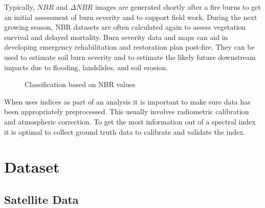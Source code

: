 \documentclass[12pt]{svproc}
\begin{document}
Typically, $NBR$ and $\Delta NBR$ images are generated shortly after a fire burns to get an initial assessment of burn severity and to support field work. During the next growing season, NBR datasets are often calculated again to assess vegetation survival and delayed mortality. Burn severity data and maps can aid in developing emergency rehabilitation and restoration plan post-fire. They can be used to estimate soil burn severity and to estimate the likely future downstream impacts due to flooding, landslides, and soil erosion. \\

\begin{figure}{}
	\label{fig:subim1}
	\centering
	\caption{Classification based on NBR values}
\end{figure}

 When uses indices as part of an analysis it is important to make sure data has been appropriately preprocessed. This usually involves radiometric calibration and atmospheric correction. To get the most information out of a spectral index it is optimal to collect ground truth data to calibrate and validate the index.

\section{Dataset}
\subsection{Satellite Data}
\end{document}
